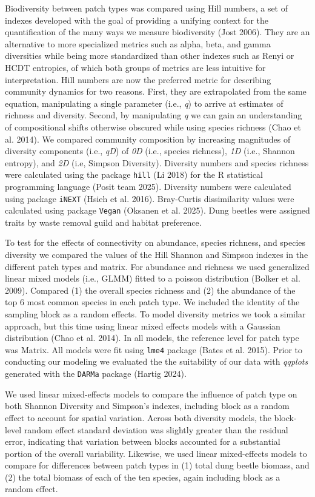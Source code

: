 \documentclass[
  man, donotrepeattitle]{apa6}
\begin{document}
Biodiversity between patch types was compared using Hill numbers, a set of indexes developed with the goal of providing a unifying context for the quantification of the many ways we measure biodiversity (Jost 2006). They are an alternative to more specialized metrics such as alpha, beta, and gamma diversities while being more standardized than other indexes such as Renyi or HCDT entropies, of which both groups of metrics are less intuitive for interpretation. Hill numbers are now the preferred metric for describing community dynamics for two reasons. First, they are extrapolated from the same equation, manipulating a single parameter (i.e., \emph{q}) to arrive at estimates of richness and diversity. Second, by manipulating \emph{q} we can gain an understanding of compositional shifts otherwise obscured while using species richness (Chao et al. 2014). We compared community composition by increasing magnitudes of diversity components (i.e., \emph{qD}) of \emph{0D} (i.e., species richness), \emph{1D} (i.e., Shannon entropy), and \emph{2D} (i.e, Simpson Diversity). Diversity numbers and species richness were calculated using the package \texttt{hill} (Li 2018) for the R statistical programming language (Posit team 2025). Diversity numbers were calculated using package \texttt{iNEXT} (Hsieh et al. 2016). Bray-Curtis dissimilarity values were calculated using package \texttt{Vegan} (Oksanen et al. 2025). Dung beetles were assigned traits by waste removal guild and habitat preference.

To test for the effects of connectivity on abundance, species richness, and species diversity we compared the values of the Hill Shannon and Simpson indexes in the different patch types and matrix. For abundance and richness we used generalized linear mixed models (i.e., GLMM) fitted to a poisson distribution (Bolker et al. 2009). Compared (1) the overall species richness and (2) the abundance of the top 6 most common species in each patch type. We included the identity of the sampling block as a random effects. To model diversity metrics we took a similar approach, but this time using linear mixed effects models with a Gaussian distribution (Chao et al. 2014). In all models, the reference level for patch type was Matrix. All models were fit using \texttt{lme4} package (Bates et al. 2015). Prior to conducting our modeling we evaluated the the suitability of our data with \emph{qqplots} generated with the \texttt{DARMa} package (Hartig 2024).

We used linear mixed-effects models to compare the influence of patch type on both Shannon Diversity and Simpson's indexes, including block as a random effect to account for spatial variation. Across both diversity models, the block-level random effect standard deviation was slightly greater than the residual error, indicating that variation between blocks accounted for a substantial portion of the overall variability. Likewise, we used linear mixed-effects models to compare for differences between patch types in (1) total dung beetle biomass, and (2) the total biomass of each of the ten species, again including block as a random effect.
\end{document}
